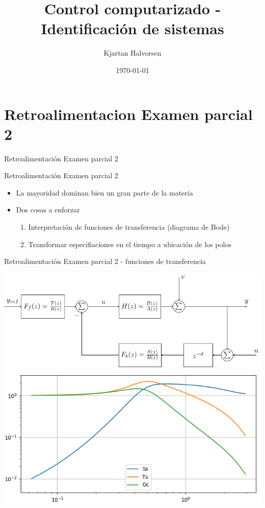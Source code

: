 \documentclass[presentation,aspectratio=169]{beamer}
\author{Kjartan Halvorsen}
\date{\today}
\title{Control computarizado - Identificación de sistemas}
\begin{document}
\maketitle

\section{Retroalimentacion Examen parcial 2}
\label{sec:org98ccb9c}

\begin{frame}[label={sec:org155943b}]{Retroalimentación Examen parcial 2}
\end{frame}

\begin{frame}[label={sec:orgf5fc6f2}]{Retroalimentación Examen parcial 2}
\begin{itemize}
\item La mayoridad dominan bien un gran parte de la materia
\item Dos cosas a enforzar
\begin{enumerate}
\item Interpretación de funciones de transferencia (diagrama de Bode)
\item Transformar especifiaciones en el tiempo a ubicación de los polos
\end{enumerate}
\end{itemize}
\end{frame}

\begin{frame}[label={sec:orga0e0b05}]{Retroalimentación Examen parcial 2 - funciones de transferencia}
\begin{center}
\includegraphics[width=0.6\linewidth]{../../figures/2dof-block-explicit}\\
\includegraphics[width=0.6\linewidth]{../../figures/sensitivity-fcn-bode-example.png}
\end{center}
\end{frame}
\end{document}
